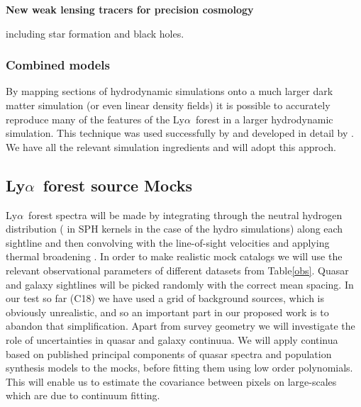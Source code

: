\documentclass[12pt]{article}
\def\lya{Ly$\alpha$}
\begin{document}
\topmargin=-2.105cm
\oddsidemargin=-0.1cm
\evensidemargin=0cm

\begin{center}
{\LARGE \bf New weak lensing tracers for precision cosmology}
\end{center}

\begin{small}





including star formation and black holes.

\subsubsection{Combined models}
By mapping sections of hydrodynamic simulations onto a much larger
dark matter simulation (or even linear density fields) it is possible
to accurately reproduce many of the features of the \lya\ forest
in a larger hydrodynamic simulation. This
technique was used successfully by \cite{croft2004} and developed in
detail by \cite{peirani2014}. We have all the relevant 
simulation ingredients and will adopt this approch.

\subsection{\lya\ forest source Mocks}
\lya\ forest spectra will be made by integrating through the
neutral hydrogen distribution ( in SPH kernels in the case of the hydro
simulations)
along each sightline and then convolving with the line-of-sight velocities
and applying thermal broadening \citep{hernquist1996}.
 In order to make realistic
mock catalogs we will use the relevant observational parameters
of different datasets from Table\ref{obs}. Quasar and galaxy sightlines will
be picked randomly with the correct mean spacing. In our test so far
(C18) we have used a grid of background sources, which is obviously
unrealistic, and so an important part in our proposed work is to abandon
that simplification. Apart from survey geometry we will investigate
the role of uncertainties in  quasar and galaxy continuua. We will 
apply continua based on published principal components
of quasar spectra \citep{leedr9} and population synthesis models
to the mocks, before fitting them using low order polynomials. This will
enable us to estimate the covariance between pixels on large-scales which
are due to continuum fitting.



\end{small}
\end{document}

